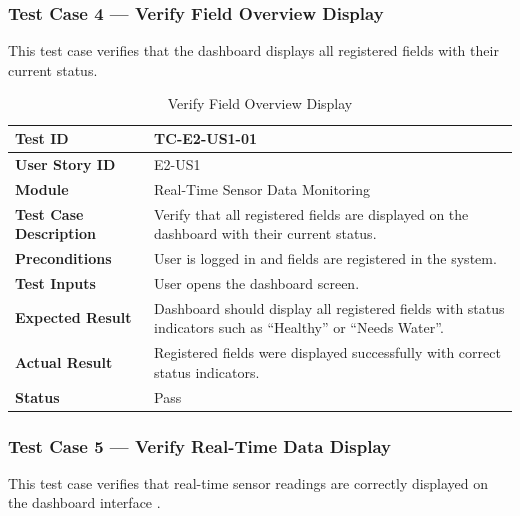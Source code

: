 \subsubsection{Test Case 4 --- Verify Field Overview Display}

This test case verifies that the dashboard displays all registered 
fields with their current status.

\begin{longtable}{|p{4cm}|p{8cm}|}
\caption{Verify Field Overview Display}
\label{tab:tc_field_overview} \\
\hline
\textbf{Test ID} & TC-E2-US1-01 \\ \hline
\textbf{User Story ID} & E2-US1 \\ \hline
\textbf{Module} & Real-Time Sensor Data Monitoring \\ \hline
\textbf{Test Case Description} & Verify that all registered fields 
are displayed on the dashboard with their current status. \\ \hline
\textbf{Preconditions} & User is logged in and fields are registered 
in the system. \\ \hline
\textbf{Test Inputs} & User opens the dashboard screen. \\ \hline
\textbf{Expected Result} & Dashboard should display all registered 
fields with status indicators such as ``Healthy'' or ``Needs 
Water''. \\ \hline
\textbf{Actual Result} & Registered fields were displayed 
successfully with correct status indicators. \\ \hline
\textbf{Status} & Pass \\ \hline
\end{longtable}

\subsubsection{Test Case 5 --- Verify Real-Time Data Display}

This test case verifies that real-time sensor readings are correctly 
displayed on the dashboard interface \cite{ncbi2023iot}.

